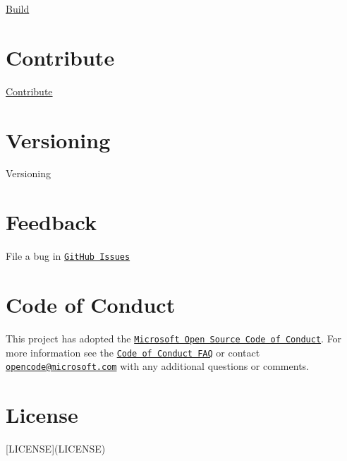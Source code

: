 \mbox{\hyperlink{BUILD_8md}{Build}}

\section*{Contribute}

\mbox{\hyperlink{CONTRIBUTING_8md}{Contribute}}

\section*{Versioning}

Versioning

\section*{Feedback}


\begin{DoxyItemize}
\item File a bug in \href{https://github.com/Microsoft/onnxruntime/issues}{\tt Git\+Hub Issues}
\end{DoxyItemize}

\section*{Code of Conduct}

This project has adopted the \href{https://opensource.microsoft.com/codeofconduct/}{\tt Microsoft Open Source Code of Conduct}. For more information see the \href{https://opensource.microsoft.com/codeofconduct/faq/}{\tt Code of Conduct F\+AQ} or contact \href{mailto:opencode@microsoft.com}{\tt opencode@microsoft.\+com} with any additional questions or comments.

\section*{License}

\mbox{[}L\+I\+C\+E\+N\+SE\mbox{]}(L\+I\+C\+E\+N\+SE) 